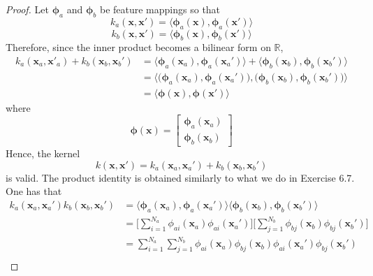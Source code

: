 \vspace{1em}

\begin{proof}
    Let $\bm{\phi}_a$ and $\bm{\phi}_b$ be feature mappings so that
    \[
        k_a(\mathbf{x}, \mathbf{x}') 
        = \langle\bm{\phi}_a(\mathbf{x}), \bm{\phi}_a(\mathbf{x}')\rangle
    \] 
    \[
        k_b(\mathbf{x}, \mathbf{x}') 
        = \langle\bm{\phi}_b(\mathbf{x}), \bm{\phi}_b(\mathbf{x}')\rangle
    \] 
    Therefore, since the inner product becomes a bilinear form on $\mathbb{R}$,
    \begin{align*}
        k_a(\mathbf{x}_a, \mathbf{x'}_a) + k_b(\mathbf{x}_b, \mathbf{x}_b')
        &= \langle\bm{\phi}_a(\mathbf{x}_a), \bm{\phi}_a(\mathbf{x}_a')\rangle
        + \langle\bm{\phi}_b(\mathbf{x}_b), \bm{\phi}_b(\mathbf{x}_b')\rangle \\
        &= \langle \big(\bm{\phi}_a(\mathbf{x}_a), \bm{\phi}_a(\mathbf{x}_a')\big),
        \big(\bm{\phi}_b(\mathbf{x}_b), \bm{\phi}_b(\mathbf{x}_b')\big) \rangle \\
        &= \langle \bm{\phi}(\mathbf{x}), \bm{\phi}(\mathbf{x'}) \rangle
    \end{align*}
    where
    \[
        \bm{\phi}(\mathbf{x}) = 
        \begin{bmatrix}
            \bm{\phi}_a(\mathbf{x}_a) \\
            \bm{\phi}_b(\mathbf{x}_b)
        \end{bmatrix}
    \] 
    Hence, the kernel 
    \begin{equation}\label{eq:6.21}\tag{6.21}
        k(\mathbf{x}, \mathbf{x}') = 
        k_a(\mathbf{x}_a, \mathbf{x}_a') +
        k_b(\mathbf{x}_b, \mathbf{x}_b')
    \end{equation}
    is valid. The product identity is obtained similarly to
    what we do in Exercise 6.7. One has that
    \begin{align*}
        k_a(\mathbf{x}_a, \mathbf{x}_a')k_b(\mathbf{x}_b, \mathbf{x}_b')
        &= \langle\bm{\phi}_a(\mathbf{x}_a), \bm{\phi}_a(\mathbf{x}_a')\rangle
        \langle\bm{\phi}_b(\mathbf{x}_b), \bm{\phi}_b(\mathbf{x}_b')\rangle \\
        &= \bigg[\sum_{i=1}^{N_a} \phi_{ai}(\mathbf{x}_a) \phi_{ai}(\mathbf{x}_a')\bigg]
        \bigg[\sum_{j=1}^{N_b} \phi_{bj}(\mathbf{x}_b) \phi_{bj}(\mathbf{x}_b')\bigg] \\
        &= \sum_{i=1}^{N_a} \sum_{j=1}^{N_b}
        \phi_{ai}(\mathbf{x}_a) \phi_{bj}(\mathbf{x}_b)
        \phi_{ai}(\mathbf{x}_a') \phi_{bj}(\mathbf{x}_b') \\

\end{align*}
\end{proof}
